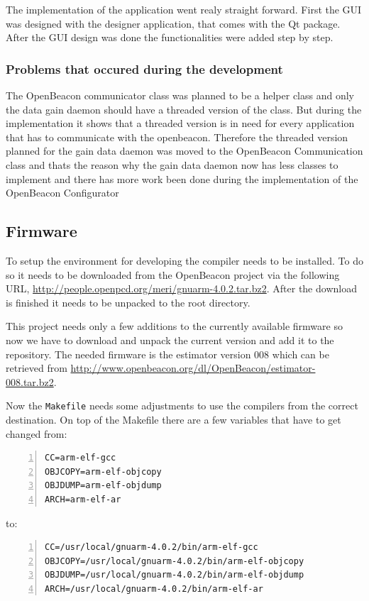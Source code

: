    The implementation of the application went realy straight forward. First the GUI was designed with the designer application, that comes with the Qt package. After the GUI design was done the functionalities were added step by step.

  \subsubsection*{Problems that occured during the development}
   The OpenBeacon communicator class was planned to be a helper class and only the data gain daemon should have a threaded version of the class. But during the implementation it shows that a threaded version is in need for every application that has to communicate with the openbeacon. Therefore the threaded version planned for the gain data daemon was moved to the OpenBeacon Communication class and thats the reason why the gain data daemon now has less classes to implement and there has more work been done during the implementation of the OpenBeacon Configurator

  \subsection{Firmware}
   To setup the environment for developing the compiler needs to be installed. To do so it needs to be downloaded from the OpenBeacon project via the following URL, \url{http://people.openpcd.org/meri/gnuarm-4.0.2.tar.bz2}. After the download is finished it needs to be unpacked to the root directory.

   This project needs only a few additions to the currently available firmware so now we have to download and unpack the current version and add it to the repository. The needed firmware is the estimator version 008 which can be retrieved from \url{http://www.openbeacon.org/dl/OpenBeacon/estimator-008.tar.bz2}.

   Now the \verb=Makefile= needs some adjustments to use the compilers from the correct destination. On top of the Makefile there are a few variables that have to get changed from:
   \begin{lstlisting}[frame=single,breaklines,basicstyle=\footnotesize,numbers=left,label=lst:firmwareMakefileOld,captionpos=b,caption={Original head of the firmware Makefile}]
CC=arm-elf-gcc
OBJCOPY=arm-elf-objcopy
OBJDUMP=arm-elf-objdump
ARCH=arm-elf-ar
   \end{lstlisting}
   to:
   \begin{lstlisting}[frame=single,breaklines,basicstyle=\footnotesize,numbers=left,label=lst:firmwareMakefileNew,captionpos=b,caption={Changed head of the firmware Makefile}]
CC=/usr/local/gnuarm-4.0.2/bin/arm-elf-gcc
OBJCOPY=/usr/local/gnuarm-4.0.2/bin/arm-elf-objcopy
OBJDUMP=/usr/local/gnuarm-4.0.2/bin/arm-elf-objdump
ARCH=/usr/local/gnuarm-4.0.2/bin/arm-elf-ar
   \end{lstlisting}

